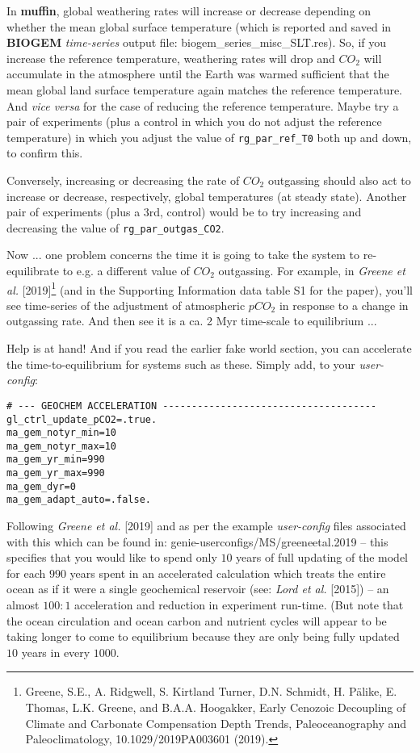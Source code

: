 In \textbf{muffin}, global weathering rates will increase or decrease depending on whether the mean global surface temperature (which is reported and saved in \textbf{BIOGEM} \textit{time-series} output file: \textsf{\footnotesize biogem\_series\_misc\_SLT.res}). So, if you increase the reference temperature, weathering rates will drop and \(CO_{2}\) will accumulate in the atmosphere until the Earth was warmed sufficient that the mean global land surface temperature again matches the reference temperature. And \textit{vice versa} for the case of reducing the reference temperature. Maybe try a pair of experiments (plus a control in which you do not adjust the reference temperature) in which you adjust the value of \texttt{rg\_par\_ref\_T0} both up and down, to confirm this.

Conversely, increasing or decreasing the rate of \(CO_{2}\) outgassing should also act to increase or decrease, respectively, global temperatures (at steady state). Another pair of experiments (plus a 3rd, control) would be to try increasing and decreasing the value of \texttt{rg\_par\_outgas\_CO2}.

Now ... one problem concerns the time it is going to take the system to re-equilibrate to e.g. a different value of \(CO_{2}\) outgassing. For example, in \textit{Greene et al.} [2019]\footnote{ Greene, S.E., A. Ridgwell, S. Kirtland Turner, D.N. Schmidt, H. Pälike, E. Thomas, L.K. Greene, and B.A.A. Hoogakker, Early Cenozoic Decoupling of Climate and Carbonate Compensation Depth Trends, Paleoceanography and Paleoclimatology, 10.1029/2019PA003601 (2019).} (and in the Supporting Information data table S1 for the paper), you'll see time-series of the adjustment of atmospheric \(pCO_{2}\) in response to a change in outgassing rate. And then see it is a ca. 2 Myr time-scale to equilibrium ...

Help is at hand! And if you read the earlier fake world section, you can accelerate the time-to-equilibrium for systems such as these. Simply add, to your \textit{user-config}:

\vspace{-1mm}\small\begin{verbatim}
# --- GEOCHEM ACCELERATION -------------------------------------
gl_ctrl_update_pCO2=.true.
ma_gem_notyr_min=10
ma_gem_notyr_max=10
ma_gem_yr_min=990
ma_gem_yr_max=990
ma_gem_dyr=0
ma_gem_adapt_auto=.false.
\end{verbatim}\normalsize\vspace{-1mm}
Following \textit{Greene et al.} [2019] and as per the example \textit{user-config} files associated with this which can be found in: \textsf{\footnotesize genie-userconfigs/MS/greeneetal.2019} -- this specifies that you would like to spend only \(10\) years of full updating of the model for each \(990\) years spent in an accelerated calculation which treats the entire ocean as if it were a single geochemical reservoir (see: \textit{Lord et al.} [2015]) -- an almost \(100:1\) acceleration and reduction in experiment run-time. (But note that the ocean circulation and ocean carbon and nutrient cycles will appear to be taking longer to come to equilibrium because they are only being fully updated \(10\) years in every \(1000\).

